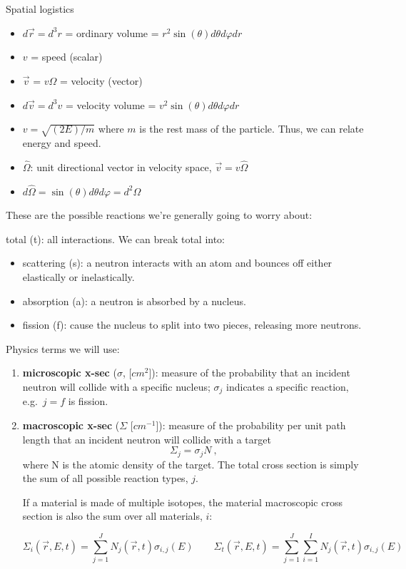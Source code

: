\documentclass[12pt]{article}
\newcommand{\vOmega}{\ensuremath{\hat{\Omega}}}
\begin{document}
Spatial logistics
\begin{itemize}
\item $d\vec{r} = d^3r$ = ordinary volume =
      $r^2 \sin(\theta) d\theta d\varphi dr$
\item $v$ = speed (scalar)
\item $\vec{v}$ = $v\vOmega$ = velocity (vector)
\item $d\vec{v} = d^3v$ = velocity volume =
      $v^2 \sin(\theta)d\theta d\varphi dr$
\item $v = \sqrt{(2E)/m}$ where $m$ is the rest mass of the particle. Thus, we 
      can relate energy and speed.

\item $\vOmega$: unit directional vector in velocity space,
      $\vec{v} = v\vOmega$
\item $d\vOmega = \sin(\theta)d\theta d\varphi =  d^2\Omega$
\end{itemize}

These are the possible reactions we're generally going to worry about:

\hspace*{1em}total (t): all interactions. We can break total into:
\begin{itemize}
\item scattering (s): a neutron interacts with an atom and bounces off either 
      elastically or inelastically.
\item absorption (a): a neutron is absorbed by a nucleus.
\item fission (f): cause the nucleus to split into two pieces, releasing more 
      neutrons.
\end{itemize}

Physics terms we will use:

\begin{enumerate}
\item \textbf{microscopic x-sec} ($\sigma$, [$cm^2$]): measure of the 
      probability that an incident neutron will collide with a specific 
      nucleus; $\sigma_j$ indicates a specific reaction, e.g.\ $j=f$ is 
      fission.
\item \textbf{macroscopic x-sec} ($\Sigma$ [$cm^{-1}$]): measure of the 
      probability per unit path length that an incident neutron will collide 
      with a target \[\Sigma_j = \sigma_j N\:,\] where N is the atomic density 
      of the target. The total cross section is simply the sum of all possible 
      reaction types, $j$. 

If a material is made of multiple isotopes, the material macroscopic cross 
section is also the sum over all materials, $i$:

\[
\Sigma_i(\vec{r}, E, t) =
\sum_{j=1}^J  N_j(\vec{r}, t)\sigma_{i,j}(E)
\qquad
\Sigma_t(\vec{r}, E, t) =
\sum_{j=1}^J \sum_{i=1}^I N_j(\vec{r}, t)\sigma_{i,j}(E)
\]

\end{enumerate}
\end{document}
